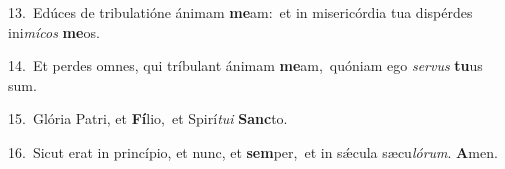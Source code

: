 {\numbfont\textcolor{\numbcolor}{13.}}~Edúces de tribulatióne ánimam \textbf{me}\-am:~\star et in misericórdia tua dispérdes ini\-\textit{mí}\-\textit{cos} \textbf{me}\-os.\par
{\numbfont\textcolor{\numbcolor}{14.}}~Et perdes omnes, qui tríbulant ánimam \textbf{me}\-am,~\star quóniam ego \textit{ser}\-\textit{vus} \textbf{tu}\-us sum.\par
{\numbfont\textcolor{\numbcolor}{15.}}~Glória Patri, et \textbf{Fí}\-lio,~\star et Spirí\-\textit{tu}\-\textit{i} \textbf{Sanc}\-to.\par
{\numbfont\textcolor{\numbcolor}{16.}}~Sicut erat in princípio, et nunc, et \textbf{sem}\-per,~\star et in sǽcula sæcu\-\textit{ló}\-\textit{rum}. \textbf{A}\-men.\par
